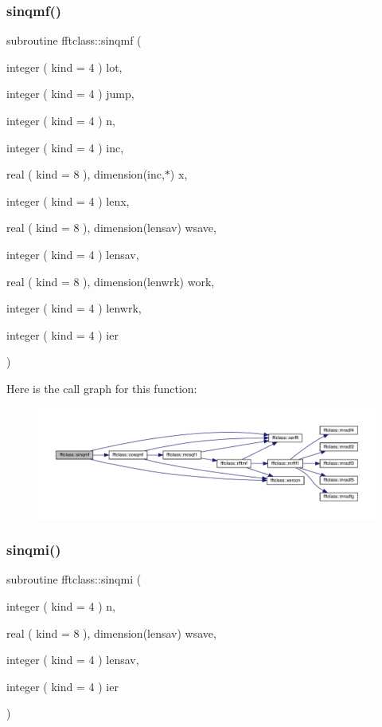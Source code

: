 \subsubsection{\texorpdfstring{sinqmf()}{sinqmf()}}
{\footnotesize\ttfamily subroutine fftclass\+::sinqmf (\begin{DoxyParamCaption}\item[{integer ( kind = 4 )}]{lot,  }\item[{integer ( kind = 4 )}]{jump,  }\item[{integer ( kind = 4 )}]{n,  }\item[{integer ( kind = 4 )}]{inc,  }\item[{real ( kind = 8 ), dimension(inc,$\ast$)}]{x,  }\item[{integer ( kind = 4 )}]{lenx,  }\item[{real ( kind = 8 ), dimension(lensav)}]{wsave,  }\item[{integer ( kind = 4 )}]{lensav,  }\item[{real ( kind = 8 ), dimension(lenwrk)}]{work,  }\item[{integer ( kind = 4 )}]{lenwrk,  }\item[{integer ( kind = 4 )}]{ier }\end{DoxyParamCaption})}

Here is the call graph for this function\+:\nopagebreak
\begin{figure}[H]
\begin{center}
\leavevmode
\includegraphics[width=350pt]{namespacefftclass_ae56c7f24f27f2fb48f15359441b5e82f_cgraph}
\end{center}
\end{figure}
\mbox{\label{namespacefftclass_a642a9e3f241f3aaa6baf58741d4cdd3b}} 
\subsubsection{\texorpdfstring{sinqmi()}{sinqmi()}}
{\footnotesize\ttfamily subroutine fftclass\+::sinqmi (\begin{DoxyParamCaption}\item[{integer ( kind = 4 )}]{n,  }\item[{real ( kind = 8 ), dimension(lensav)}]{wsave,  }\item[{integer ( kind = 4 )}]{lensav,  }\item[{integer ( kind = 4 )}]{ier }\end{DoxyParamCaption})}

